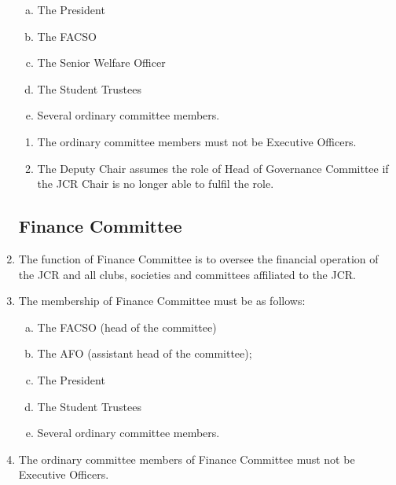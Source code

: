 \documentclass[12pt]{article}
\begin{document}
\begin{enumerate}
\begin{enumerate}[(a)]
        \item The President
        \item The FACSO
        \item The Senior Welfare Officer
        \item The Student Trustees
        \item Several ordinary committee members.
    \end{enumerate}
    \begin{enumerate}
        \item The ordinary committee members must not be Executive Officers.
        \item The Deputy Chair assumes the role of Head of Governance Committee if the JCR Chair is no longer able to fulfil the role.
    \end{enumerate}

    \subsection{Finance Committee}
    \item The function of Finance Committee is to oversee the financial operation of the JCR and all clubs, societies and committees affiliated to the JCR.

    \item The membership of Finance Committee must be as follows:
    \begin{enumerate}[(a)]
        \item The FACSO (head of the committee)
        \item The AFO (assistant head of the committee);
        \item The President
        \item The Student Trustees
        \item Several ordinary committee members.
    \end{enumerate}
    \item The ordinary committee members of Finance Committee must not be Executive Officers.


\end{enumerate}
\end{document}
